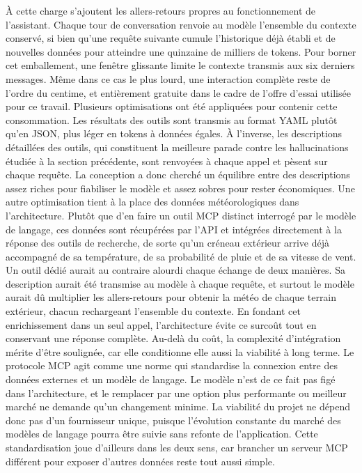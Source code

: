 \documentclass[12pt]{article}
\begin{document}
\vspace{0.2cm}
À cette charge s'ajoutent les allers-retours propres au fonctionnement de l'assistant. Chaque tour de conversation renvoie au modèle l'ensemble du contexte conservé, si bien qu'une requête suivante cumule l'historique déjà établi et de nouvelles données pour atteindre une quinzaine de milliers de tokens. Pour borner cet emballement, une fenêtre glissante limite le contexte transmis aux six derniers messages. Même dans ce cas le plus lourd, une interaction complète reste de l'ordre du centime, et entièrement gratuite dans le cadre de l'offre d'essai utilisée pour ce travail.
\newline\newline
Plusieurs optimisations ont été appliquées pour contenir cette consommation. Les résultats des outils sont transmis au format YAML plutôt qu'en JSON, plus léger en tokens à données égales. À l'inverse, les descriptions détaillées des outils, qui constituent la meilleure parade contre les hallucinations étudiée à la section précédente, sont renvoyées à chaque appel et pèsent sur chaque requête. La conception a donc cherché un équilibre entre des descriptions assez riches pour fiabiliser le modèle et assez sobres pour rester économiques.
\newline\newline
Une autre optimisation tient à la place des données météorologiques dans l'architecture. Plutôt que d'en faire un outil MCP distinct interrogé par le modèle de langage, ces données sont récupérées par l'API et intégrées directement à la réponse des outils de recherche, de sorte qu'un créneau extérieur arrive déjà accompagné de sa température, de sa probabilité de pluie et de sa vitesse de vent. Un outil dédié aurait au contraire alourdi chaque échange de deux manières. Sa description aurait été transmise au modèle à chaque requête, et surtout le modèle aurait dû multiplier les allers-retours pour obtenir la météo de chaque terrain extérieur, chacun rechargeant l'ensemble du contexte. En fondant cet enrichissement dans un seul appel, l'architecture évite ce surcoût tout en conservant une réponse complète.
\newline\newline
Au-delà du coût, la complexité d'intégration mérite d'être soulignée, car elle conditionne elle aussi la viabilité à long terme. Le protocole MCP agit comme une norme qui standardise la connexion entre des données externes et un modèle de langage. Le modèle n'est de ce fait pas figé dans l'architecture, et le remplacer par une option plus performante ou meilleur marché ne demande qu'un changement minime. La viabilité du projet ne dépend donc pas d'un fournisseur unique, puisque l'évolution constante du marché des modèles de langage pourra être suivie sans refonte de l'application. Cette standardisation joue d'ailleurs dans les deux sens, car brancher un serveur MCP différent pour exposer d'autres données reste tout aussi simple.
\end{document}
